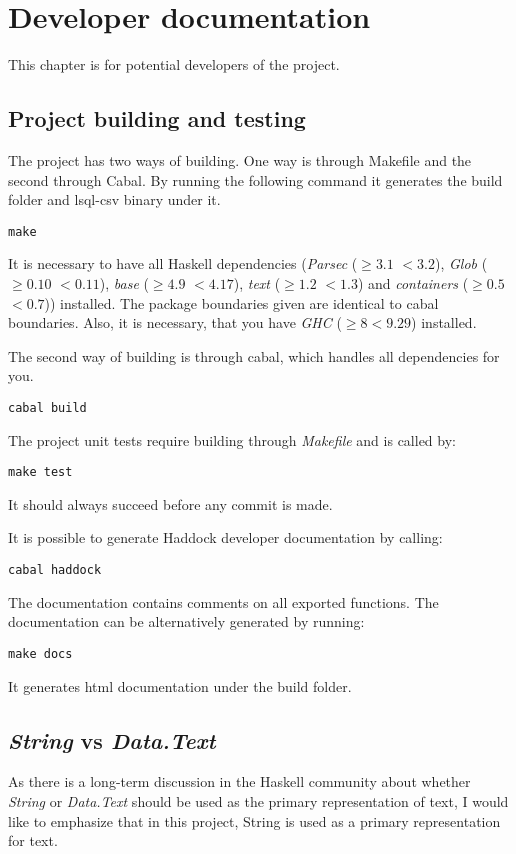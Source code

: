 \chapter{Developer documentation}
This chapter is for potential developers of the project.

\section{Project building and testing}
The project has two ways of building. One way is through Makefile and the second through Cabal. 
By running the following command it generates the build folder and lsql-csv binary under it.
\begin{verbatim}
make
\end{verbatim}
 
It is necessary to have all Haskell dependencies (\textit{Parsec} ($\geq 3.1$ $<3.2$), \textit{Glob} ($\geq 0.10$ $<0.11$), 
\textit{base} ($\geq 4.9$ $<4.17$), \textit{text} ($\geq 1.2$ $<1.3$) and \textit{containers} ($\geq 0.5$ $<0.7$)) installed.
The package boundaries given are identical to cabal boundaries. Also, it is necessary, that you have \textit{GHC} ($\geq 8 <9.29$) installed.

The second way of building is through cabal, which handles all dependencies for you.

\begin{verbatim}
cabal build
\end{verbatim}


The project unit tests require building through \textit{Makefile} and is called by:
\begin{verbatim}
make test
\end{verbatim}
It should always succeed before any commit is made.

It is possible to generate Haddock developer documentation by calling:
\begin{verbatim}
cabal haddock
\end{verbatim}

The documentation contains comments on all exported functions. The documentation can be alternatively generated
by running:

\begin{verbatim}
make docs
\end{verbatim}
It generates html documentation under the build folder.

\section{\textit{String} vs \textit{Data.Text}}
As there is a long-term discussion in the Haskell community about whether \textit{String} or \textit{Data.Text} should be used as the 
primary representation of text, I would like to emphasize that in this project, String is used as a primary
representation for text.

